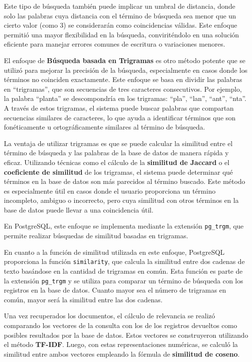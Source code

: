 Este tipo de búsqueda también puede implicar un umbral de distancia, donde solo las palabras cuya distancia con el término de búsqueda sea menor que un cierto valor 
(como 3) se considerarán como coincidencias válidas. Este enfoque permitió una mayor flexibilidad en la búsqueda, conviriténdolo en una solución eficiente para 
manejar errores comunes de escritura o variaciones menores.

El enfoque de \textbf{Búsqueda basada en Trigramas} es otro método potente que se utilizó para mejorar la precisión de la búsqueda, especialmente en casos donde los términos no coinciden exactamente. 
Este enfoque se basa en dividir las palabras en ``trigramas'', que son secuencias de tres caracteres consecutivos. Por ejemplo, la palabra ``planta'' se 
descompondría en los trigramas: ``pla'', ``lan'', ``ant'', ``nta''. A través de estos trigramas, el sistema puede buscar palabras que compartan secuencias similares de caracteres, 
lo que ayuda a identificar términos que son fonéticamente u ortográficamente similares al término de búsqueda.

La ventaja de utilizar trigramas es que se puede calcular la similitud entre el término de búsqueda y las palabras de la base de datos de manera rápida y eficaz. Utilizando 
técnicas como el cálculo de la \textbf{similitud de Jaccard} o el \textbf{coeficiente de similitud} de los trigramas, el sistema puede determinar qué términos en la base de datos 
son más parecidos al término buscado. Este método es especialmente útil en casos donde el usuario proporciona un término incompleto, ambiguo o incorrecto, pero cuya similitud con otros términos en la base de datos 
puede llevar a una coincidencia útil.

En PostgreSQL, este enfoque se implementa mediante la extensión \texttt{pg\_trgm}, que permite realizar búsquedas de similitud basadas en trigramas. 

En cuanto a la función de similitud utilizada en este enfoque, PostgreSQL proporciona la función \texttt{similarity}, que calcula la similitud entre dos cadenas de texto basándose en la cantidad de trigramas en común. 
Esta función es parte de la extensión \texttt{pg\_trgm} y se utiliza para comparar un término de búsqueda con los registros en la base de datos. Cuanto mayor sea el número de trigramas en común, mayor será la similitud entre las dos cadenas.

Una vez recuperados los documentos, el cálculo de relevancia se realizó comparando los vectores de la consulta con los de los registros devueltos como posibles resultados por la base de datos. Estos vectores se construyeron utilizando el método \textbf{TF-IDF}. Luego, con estas representaciones 
numéricas, se calculó la similitud entre ambos vectores empleando la fórmula de \textbf{similitud de coseno}. 

